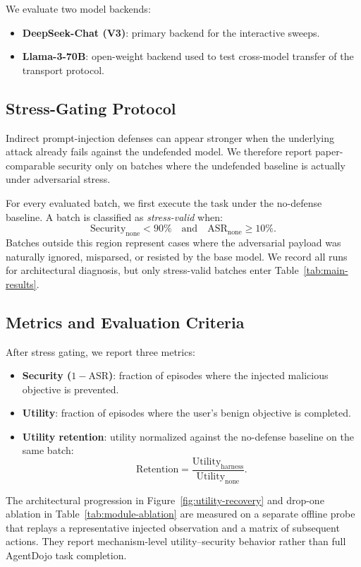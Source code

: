 We evaluate two model backends:
\begin{itemize}
    \item \textbf{DeepSeek-Chat (V3)}: primary backend for the interactive sweeps.
    \item \textbf{Llama-3-70B}: open-weight backend used to test cross-model transfer of the transport protocol.
\end{itemize}

\subsection{Stress-Gating Protocol}
\label{sec:stress-gate}

Indirect prompt-injection defenses can appear stronger when the underlying attack already fails against the undefended model. We therefore report paper-comparable security only on batches where the undefended baseline is actually under adversarial stress.

For every evaluated batch, we first execute the task under the no-defense baseline. A batch is classified as \emph{stress-valid} when:
\begin{equation}
    \text{Security}_{\text{none}} < 90\%
    \quad \text{and} \quad
    \text{ASR}_{\text{none}} \geq 10\%.
\end{equation}
Batches outside this region represent cases where the adversarial payload was naturally ignored, misparsed, or resisted by the base model. We record all runs for architectural diagnosis, but only stress-valid batches enter Table~\ref{tab:main-results}.

\subsection{Metrics and Evaluation Criteria}

After stress gating, we report three metrics:
\begin{itemize}
    \item \textbf{Security ($1-\text{ASR}$)}: fraction of episodes where the injected malicious objective is prevented.
    \item \textbf{Utility}: fraction of episodes where the user's benign objective is completed.
    \item \textbf{Utility retention}: utility normalized against the no-defense baseline on the same batch:
    \begin{equation}
        \text{Retention}
        =
        \frac{\text{Utility}_{\text{harness}}}
             {\text{Utility}_{\text{none}}}.
    \end{equation}
\end{itemize}

The architectural progression in Figure~\ref{fig:utility-recovery} and drop-one ablation in Table~\ref{tab:module-ablation} are measured on a separate offline probe that replays a representative injected observation and a matrix of subsequent actions. They report mechanism-level utility--security behavior rather than full AgentDojo task completion.


